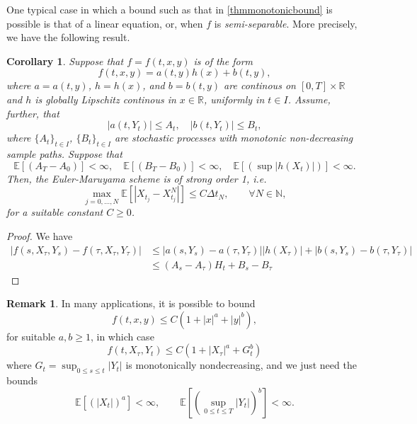 \documentclass[reqno,12pt]{amsart}
\theoremstyle{plain}%
\newtheorem{cor}{Corollary}[section]
\theoremstyle{definition}
\newtheorem{rmk}{Remark}[section]
\begin{document}
One typical case in which a bound such as that in \cref{thmmonotonicbound} is possible is that of a linear equation, or, when $f$ is \emph{semi-separable}. More precisely, we have the following result.

\begin{cor}
    \label{thmsemiseparablemonotonicbound}
  Suppose that $f=f(t, x, y)$ is of the form
  \begin{equation}
    \label{lineareqform}
    f(t, x, y) = a(t, y)h(x) + b(t, y),
  \end{equation}
  where $a=a(t, y)$, $h=h(x)$, and $b=b(t, y)$ are continous on $[0, T]\times \mathbb{R}$ and $h$ is globally Lipschitz continous in $x\in\mathbb{R}$, uniformly in $t\in I$. Assume, further, that
  \[
    |a(t, Y_t)| \leq A_t, \quad |b(t, Y_t)| \leq B_t,
  \]
  where $\{A_t\}_{t\in I}$, $\{B_t\}_{t\in I}$ are stochastic processes with monotonic non-decreasing sample paths. Suppose that
  \[
    \mathbb{E}[(A_T - A_0)] < \infty, \quad \mathbb{E}[(B_T - B_0)] < \infty, \quad \mathbb{E}[(\sup |h(X_t)|)] < \infty.
  \]
  Then, the Euler-Maruyama scheme is of strong order 1, i.e.
  \begin{equation}
    \max_{j=0, \ldots, N}\mathbb{E}\left[ \left| X_{t_j} - X_{t_j}^N \right| \right] \leq C \Delta t_N, \qquad \forall N \in \mathbb{N},
  \end{equation}
  for a suitable constant $C \geq 0$.
\end{cor}

\begin{proof}
    We have
    \begin{align*}
        |f(s, X_\tau, Y_s) - f(\tau, X_\tau, Y_\tau)| & \leq |a(s, Y_s) - a(\tau, Y_\tau)||h(X_\tau)| + |b(s, Y_s) - b(\tau, Y_\tau)| \\
        & \leq (A_s - A_\tau)H_t + B_s - B_\tau
    \end{align*}
\end{proof}

\begin{rmk}
    In many applications, it is possible to bound
    $$
        f(t, x, y) \leq C(1 + |x|^a + |y|^b),
    $$
    for suitable $a, b \geq 1$, in which case
    $$
        f(t, X_\tau, Y_t) \leq C(1 + |X_\tau|^a + G_t^b)
    $$
    where $G_t = \sup_{0 \leq s \leq t} |Y_t|$ is monotonically nondecreasing, and we just need the bounds
    $$
    \mathbb{E}[(|X_t|)^a] < \infty, \qquad \mathbb{E}[(\sup_{0\leq t \leq T} |Y_t|)^b] < \infty.
    $$
\end{rmk}
\end{document}
